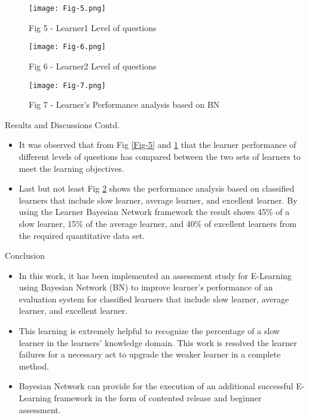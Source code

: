\documentclass{beamer}
\begin{document}
\begin{frame}
    \begin{figure}
\centering
\parbox{5cm}{
\texttt{[image: Fig-5.png]}
\caption{Fig 5 - Learner1 Level of questions}
\label{Fig-5}}
\qquad
\begin{minipage}{5cm}
\texttt{[image: Fig-6.png]}
\caption{Fig 6 - Learner2 Level of questions}
\label{Fig-6}
\end{minipage}
\end{figure}
\end{frame}

\begin{frame}
    \begin{figure}[ht]
            \centering
            \texttt{[image: Fig-7.png]}
            \caption{Fig 7 - Learner’s Performance analysis based on BN}
            \label{Fig-7}
    \end{figure}
\end{frame}

\begin{frame}
\begin{block}{Results and Discussions Contd.}
\begin{itemize}
    \item It was observed that from Fig \ref{Fig-5} and \ref{Fig-6} that the learner performance of different levels of questions has compared between the two sets of learners to meet the learning objectives.
    \item Last but not least Fig \ref{Fig-7} shows the performance analysis based on classified learners that include slow learner, average learner, and excellent learner. By using the Learner Bayesian Network framework the result shows 45\% of a slow learner, 15\% of the average learner, and 40\% of excellent learners from the required quantitative data set.
\end{itemize}
\end{block}
\end{frame}

\begin{frame}
\begin{block}{Conclusion}
\begin{itemize}
    \item In this work, it has been implemented an assessment study for E-Learning using Bayesian Network (BN) to improve learner’s performance of an evaluation system for classified learners that include slow learner, average learner, and excellent learner.
    \item This learning is extremely helpful to recognize the percentage of a slow learner in the learners’ knowledge domain. This work is resolved the learner failures for a necessary act to upgrade the weaker learner in a complete method.
    \item Bayesian Network can provide for the execution of an additional successful E-Learning framework in the form of contented release and beginner assessment.
\end{itemize}
\end{block}
\end{frame}
\end{document}
